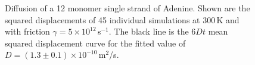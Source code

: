 \begin{figure}[htb]
       \begin{center}
               \scalebox{0.9}{
                        \nonstopmode
                        
                        \errorstopmode
                        \rule[-0.5cm]{0cm}{0cm}}
			\caption{Diffusion of a 12 monomer single strand of Adenine. Shown are the squared displacements of 45 individual simulations at 300\,K and with friction $\gamma = 5 \times 10^{12}$\,s$^{-1}$. The black line is the $6Dt$ mean squared displacement curve for the fitted value of $D = (1.3 \pm 0.1) \times 10^{-10}$\,m$^2$/s.}
		\label{diffusion}
        \end{center}
\end{figure}

